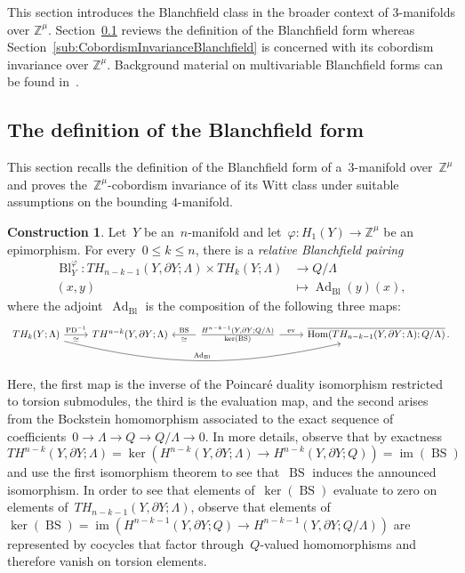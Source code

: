 \documentclass[10.9pt,a4paper]{amsart}
\theoremstyle{definition}
\newtheorem{construction}[theorem]{Construction}
\theoremstyle{remark}
\newcommand{\Z}{\mathbb{Z}}
\newcommand{\Bl}{\operatorname{Bl}}
\newcommand{\ev}{\operatorname{ev}}
\newcommand{\BS}{\operatorname{BS}}
\newcommand{\im}{\operatorname{im}}
\newcommand{\Hom}{\operatorname{Hom}}
\newcommand{\Ad}{\operatorname{Ad}}
\begin{document}
This section introduces the Blanchfield class in the broader context of $3$-manifolds over $\Z^\mu$.
Section~\ref{sub:BlanchfieldDef} reviews the definition of the Blanchfield form whereas Section~\ref{sub:CobordismInvarianceBlanchfield} is concerned with its cobordism invariance over $\Z^\mu$.
Background material on multivariable Blanchfield forms can be found in~\cite{Hillman,BorodzikFriedlPowell}.

\subsection{The definition of the Blanchfield form}
\label{sub:BlanchfieldDef}

This section recalls the definition of the Blanchfield form of a~$3$-manifold over~$\Z^\mu$ and proves the~$\Z^\mu$-cobordism invariance of its Witt class under suitable assumptions on the bounding $4$-manifold.

\begin{construction}
\label{cons:Blanchfield}
Let~$Y$ be an~$n$-manifold and let~$\varphi\colon H_1(Y)\to\Z^\mu$ be an epimorphism.
For every~$0 \leq k \leq n$,  there is a \emph{relative Blanchfield pairing} 
\begin{align*}
\label{eq:Bl}
\Bl_Y^\varphi \colon TH_{n-k-1}(Y, \partial Y;\Lambda) \times TH_k(Y; \Lambda) &\longrightarrow Q \slash \Lambda \\
(x,y) &\longmapsto  \Ad_{\Bl}(y)(x),
\end{align*}
where the adjoint~$\Ad_{\Bl}$ is the composition of the following three maps: 
\[
\begin{tikzcd}
TH_k(Y; \Lambda) \arrow[r,"\mathrm{PD}^{-1}","\cong"'] \arrow[rrr,bend right=13,"\Ad_{\Bl} "]& 
TH^{n-k}(Y, \partial Y; \Lambda)&
\frac{H^{n-k-1}(Y, \partial Y; Q \slash \Lambda)}{\ker(\BS)}\arrow[r,"\ev"]
\arrow[l,"\BS"',"\cong"] 
&\overline{\Hom(TH_{n-k-1}(Y, \partial Y ; \Lambda) ; Q\slash \Lambda)}\,.
\end{tikzcd}
\]
Here, the first map is the inverse of the Poincar\'e duality isomorphism restricted to torsion submodules, the third is the evaluation map,  and the second arises from the Bockstein homomorphism associated to the exact sequence
of coefficients~$0 \to \Lambda \to Q \to Q\slash \Lambda \to 0$. 
In more details,  observe that by exactness 
$$TH^{n-k}(Y, \partial Y; \Lambda)=\ker(H^{n-k}(Y, \partial Y; \Lambda) \to H^{n-k}(Y, \partial Y;Q))=\im(\BS)$$
and use the first isomorphism theorem to see that~$\BS$ induces the announced isomorphism. 
In order to see that elements of~$\ker(\BS)$ evaluate to zero on elements of~$TH_{n-k-1}(Y,\partial Y;\Lambda)$, observe that elements of~$\ker(\BS)=\im(H^{n-k-1}(Y,\partial Y;Q) \to H^{n-k-1}(Y,\partial Y;Q/\Lambda))$ are represented by cocycles that factor through~$Q$-valued homomorphisms and therefore vanish on torsion elements. 
\end{construction}
\end{document}
